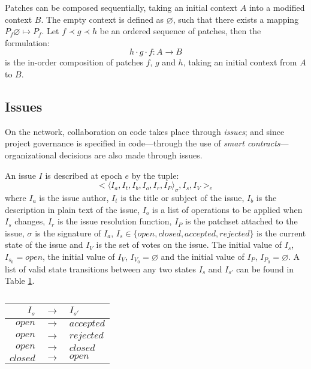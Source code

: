 Patches can be composed sequentially, taking an initial context $A$ into
a modified context $B$. The empty context is defined as $\varnothing$, such
that there exists a mapping $P_f \varnothing \mapsto P_f$. Let $f \prec g
\prec h$ be an ordered sequence of patches, then the formulation:
\[
h \cdot g \cdot f : A \to B
\]
is the in-order composition of patches $f$, $g$ and $h$, taking an initial
context from $A$ to $B$.


\subsection{Issues}

On the \oscoin{} network, collaboration on code takes place through \emph{issues};
and since project governance is specified in code---through the use of
\emph{smart contracts}---organizational decisions are also made through issues.

An issue $I$ is described at epoch $e$ by the tuple:
\[
    \big<\langle I_a, I_t, I_b, I_o, I_r, I_P \rangle_{\sigma}, I_s, I_V \big>_e
\]
where $I_a$ is the issue author, $I_t$ is the title or subject of the issue,
$I_b$ is the description in plain text of the issue, $I_o$ is a list of
operations to be applied when $I_s$ changes, $I_r$ is the issue resolution
function, $I_P$ is the patchset attached to the issue, $\sigma$ is the
signature of $I_a$, $I_s \in \{open, closed, accepted, rejected\}$ is the
current state of the issue and $I_V$ is the set of votes on the issue. The
initial value of $I_s$, $I_{s_0} = open$, the initial value of $I_V$, $I_{V_0}
= \varnothing$ and the initial value of $I_P$, $I_{P_0} = \varnothing$.  A list
of valid state transitions between any two states $I_s$ and $I_{s'}$ can be
found in Table \ref{issues-valid-transitions}.

\begin{table}[hbt]
    \caption{\label{issues-valid-transitions}}
    \begin{tabular}{rcl}
        \toprule
        $I_s$      & $\to$ & $I_{s'}$ \\
        \midrule
        $open$     & $\to$ & $accepted$ \\
        $open$     & $\to$ & $rejected$ \\
        $open$     & $\to$ & $closed$ \\
        $closed$   & $\to$ & $open$ \\
        \bottomrule
    \end{tabular}
\end{table}

